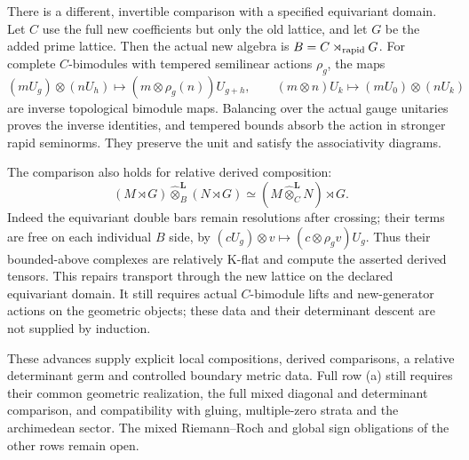 There is a different, invertible comparison with a specified equivariant
domain. Let $C$ use the full new coefficients but only the old lattice,
and let $G$ be the added prime lattice. Then the actual new algebra is
$B=C\rtimes_{\rm rapid}G$. For complete $C$-bimodules with tempered
semilinear actions $\rho_g$, the maps
\[
 (mU_g)\otimes(nU_h)\longmapsto
       (m\otimes\rho_g(n))U_{g+h},\qquad
 (m\otimes n)U_k\longmapsto(mU_0)\otimes(nU_k)
\]
are inverse topological bimodule maps. Balancing over the actual gauge
unitaries proves the inverse identities, and tempered bounds absorb
the action in stronger rapid seminorms. They preserve the unit and
satisfy the associativity diagrams.

The comparison also holds for relative derived composition:
\[
 (M\rtimes G)\widehat\otimes_B^{\mathbf L}(N\rtimes G)
       \simeq (M\widehat\otimes_C^{\mathbf L}N)\rtimes G.
\]
Indeed the equivariant double bars remain resolutions after crossing;
their terms are free on each individual $B$ side, by
$(cU_g)\otimes v\mapsto(c\otimes\rho_gv)U_g$.
Thus their bounded-above complexes are relatively K-flat and compute
the asserted derived tensors. This repairs transport through the new
lattice on the declared equivariant domain. It still requires actual
$C$-bimodule lifts and new-generator actions on the geometric objects;
these data and their determinant descent are not supplied by induction.

These advances supply explicit local compositions, derived comparisons,
a relative determinant germ and controlled boundary metric data. Full
row (a) still requires their common geometric realization, the full mixed
diagonal and determinant comparison, and compatibility
with gluing, multiple-zero strata and the archimedean sector. The mixed
Riemann--Roch and global sign obligations of the other rows remain open.
